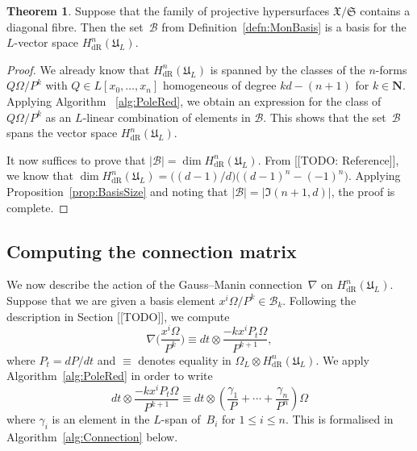 \documentclass[a4paper,11pt]{article}
\numberwithin{equation}{section}
\providecommand{\abs}[1]{\lvert#1\rvert}                 %
\newcommand{\NN}{\mathbf{N}} %
\providecommand{\HdR}{H_{\text{dR}}}    %
\providecommand{\cB}{\mathcal{B}} %
\theoremstyle{definition}
\newtheorem{thm}{Theorem}[section]
\begin{document}
\begin{thm} \label{thm:Basis}
Suppose that the family of projective hypersurfaces $\mathfrak{X}/\mathfrak{S}$ 
contains a diagonal fibre.  Then the set~$\cB$ from Definition~\ref{defn:MonBasis} 
is a basis for the $L$-vector space $\HdR^n(\mathfrak{U}_L)$.
\end{thm}

\begin{proof}
We already know that $\HdR^n(\mathfrak{U}_L)$ is spanned by the classes of the 
$n$-forms $Q \Omega / P^k$ with $Q \in L[x_0, \dotsc, x_n]$ homogeneous of degree 
$kd - (n+1)$ for $k \in \NN$. Applying Algorithm ~\ref{alg:PoleRed}, we obtain an 
expression for the class of $Q \Omega / P^k$ as an $L$-linear combination of 
elements in $\cB$.  This shows that the set~$\cB$ spans the vector space 
$\HdR^n(\mathfrak{U}_L)$.

It now suffices to prove that $\abs{\cB} = \dim \HdR^n(\mathfrak{U}_L)$. 
From [[TODO:  Reference]], we know that $\dim \HdR^n(\mathfrak{U}_L) = 
\bigl((d-1)/d\bigr) \bigl( (d-1)^n - (-1)^n \bigr)$.  
Applying Proposition~\ref{prop:BasisSize} and noting that 
$\abs{\cB} = \abs{\mathfrak{I}(n+1,d)}$, the proof is complete.
\end{proof}


\subsection{Computing the connection matrix}
\label{sec:Connection}

We now describe the action of the Gauss--Manin connection~$\nabla$ on 
$\HdR^n(\mathfrak{U}_L)$.  Suppose that we are given a basis element 
$x^i \Omega / P^k \in \cB_k$.  Following the description in Section [[TODO]], 
we compute
\begin{equation} \label{eqn:nabla}
\nabla \biggl(\frac{x^i \Omega}{P^k}\biggr) \equiv 
dt \otimes \frac{- k x^i P_t \Omega}{P^{k+1}},
\end{equation}
where $P_t = dP/dt$ and $\equiv$ denotes equality in 
$\Omega_{L} \otimes \HdR^n(\mathfrak{U}_L)$. We apply 
Algorithm~\ref{alg:PoleRed} in order to write
\begin{equation}
dt \otimes \frac{- k x^i P_t \Omega}{P^{k+1}} \equiv 
dt \otimes \left( \frac{\gamma_{1}}{P} + \dotsb + \frac{\gamma_n}{P^n} \right) \Omega
\end{equation}
where $\gamma_i$ is an element in the $L$-span of~$B_i$ for $1 \leq i \leq n$. This is
formalised in Algorithm~\ref{alg:Connection} below.
\end{document}
